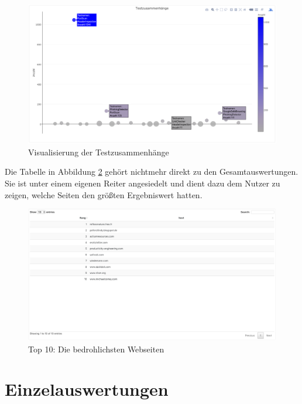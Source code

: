 \begin{figure}[H]
  \centering
  \includegraphics[width=15cm]{images/stats/testzusammenhaenge}
  \caption{Visualisierung der Testzusammenhänge\protect\footnotemark}
  \label{fig:testzusammenhaenge}
\end{figure}

Die Tabelle in Abbildung \ref{fig:top10} gehört nichtmehr direkt zu den Gesamtauswertungen. Sie ist unter einem eigenen Reiter angesiedelt und dient dazu dem Nutzer zu zeigen, welche Seiten den größten Ergebniswert hatten.
\begin{figure}[H]
  \centering
  \includegraphics[width=15cm]{images/stats/top10}
  \caption{Top 10: Die bedrohlichsten Webseiten\protect\footnotemark}
  \label{fig:top10}
\end{figure}


\section{Einzelauswertungen}

